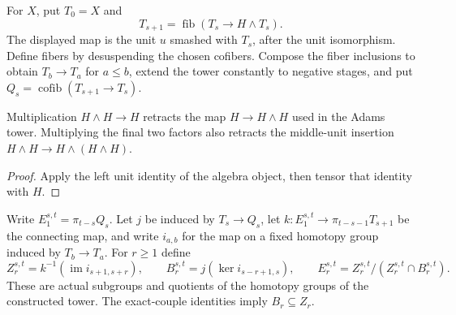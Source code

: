 \begin{definition}
  \label{def:h6-fiber-tower}
  \notready
  For $X$, put $T_0=X$ and
  \[
    T_{s+1}=\operatorname{fib}(T_s\longrightarrow H\wedge T_s).
  \]
  The displayed map is the unit $u$ smashed with $T_s$, after the unit
  isomorphism.  Define fibers by desuspending the chosen cofibers.
  Compose the fiber inclusions to obtain $T_b\to T_a$ for $a\le b$,
  extend the tower constantly to negative stages, and put
  $Q_s=\operatorname{cofib}(T_{s+1}\to T_s)$.
\end{definition}

\begin{proposition}
  \label{prop:h6-unit-splits}
  \leanok
  Multiplication $H\wedge H\to H$ retracts the map
  $H\to H\wedge H$ used in the Adams tower. Multiplying the final two
  factors also retracts the middle-unit insertion
  $H\wedge H\to H\wedge(H\wedge H)$.
\end{proposition}
\begin{proof}
  Apply the left unit identity of the algebra object, then tensor that
  identity with $H$.
  \leanok
\end{proof}

\begin{definition}
  \label{def:h6-tower-pages}
  \notready
  Write $E_1^{s,t}=\pi_{t-s}Q_s$.  Let $j$ be induced by $T_s\to Q_s$,
  let $k:E_1^{s,t}\to\pi_{t-s-1}T_{s+1}$ be the connecting map, and
  write $i_{a,b}$ for the map on a fixed homotopy group induced by
  $T_b\to T_a$.  For $r\ge1$ define
  \[
    Z_r^{s,t}=k^{-1}(\operatorname{im}i_{s+1,s+r}),\qquad
    B_r^{s,t}=j(\ker i_{s-r+1,s}),\qquad
    E_r^{s,t}=Z_r^{s,t}/(Z_r^{s,t}\cap B_r^{s,t}).
  \]
  These are actual subgroups and quotients of the homotopy groups of the
  constructed tower.  The exact-couple identities imply $B_r\subseteq Z_r$.
\end{definition}

